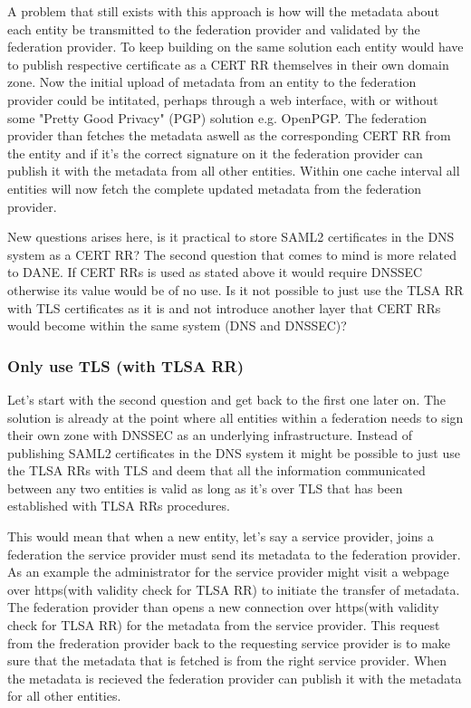 A problem that still exists with this approach is how will the metadata about each entity be transmitted to the federation provider and validated by the federation provider.
To keep building on the same solution each entity would have to publish respective certificate as a CERT RR themselves in their own domain zone.
Now the initial upload of metadata from an entity to the federation provider could be intitated, perhaps through a web interface, with or without some "Pretty Good Privacy" (PGP) solution e.g. OpenPGP\cite{rfc:2440}.
The federation provider than fetches the metadata aswell as the corresponding CERT RR from the entity and if it's the correct signature on it the federation provider can publish it with the metadata from all other entities.
Within one cache interval all entities will now fetch the complete updated metadata from the federation provider.


New questions arises here, is it practical to store SAML2 certificates in the DNS system as a CERT RR?
The second question that comes to mind is more related to DANE.
If CERT RRs is used as stated above it would require DNSSEC otherwise its value would be of no use.
Is it not possible to just use the TLSA RR with TLS certificates as it is and not introduce another layer that CERT RRs would become within the same system (DNS and DNSSEC)?

\subsubsection{Only use TLS (with TLSA RR)}
\label{subsec:only-tlsa-rr-with-tls}
Let's start with the second question and get back to the first one later on.
The solution is already at the point where all entities within a federation needs to sign their own zone with DNSSEC as an underlying infrastructure.
Instead of publishing SAML2 certificates in the DNS system it might be possible to just use the TLSA RRs with TLS and deem that all the information communicated between any two entities is valid as long as it's over TLS that has been established with TLSA RRs procedures.

This would mean that when a new entity, let's say a service provider, joins a federation the service provider must send its metadata to the federation provider.
As an example the administrator for the service provider might visit a webpage over https(with validity check for TLSA RR) to initiate the transfer of metadata.
The federation provider than opens a new connection over https(with validity check for TLSA RR) for the metadata from the service provider.
This request from the frederation provider back to the requesting service provider is to make sure that the metadata that is fetched is from the right service provider. 
When the metadata is recieved the federation provider can publish it with the metadata for all other entities.

